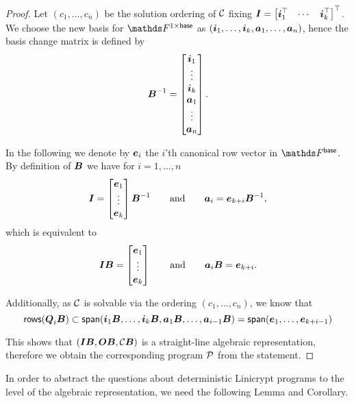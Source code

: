 \begin{proof}
Let $(c_1, \dots, c_n)$ be the solution ordering of $\C$ fixing $\I = \mtdts \vi k$.
We choose the new basis for $\Frowsp$ as $(\dts \vi k, \dts \va n)$, hence the basis change matrix is defined by
\[
    \B^{-1} = 
    \begin{bmatrix}
\vi_1 \\
\vdots \\
\vi_k \\
\va_1 \\
\vdots \\
\va_n
    \end{bmatrix}.
\]

In the following we denote by $\v e_i$ the $i$'th canonical row vector in $\Fsp$.
By definition of $\B$ we have for $i=1, \dots, n$
\begin{equation*}
\I = \begin{bmatrix}
    \v e_1 \\
    \vdots \\
    \v e_k
\end{bmatrix} \B^{-1}
\qquad \textrm{and} \qquad
\va_i = \v e_{k+i} \B^{-1},
\end{equation*}
which is equivalent to
\begin{equation*}
\I \B = \begin{bmatrix}
    \v e_1 \\
    \vdots \\
    \v e_k
\end{bmatrix}
\qquad \textrm{and} \qquad
\va_i \B = \v e_{k+i}.
\end{equation*}

Additionally, as $\C$ is solvable via the ordering $(c_1, \dots, c_n)$,
we know that 
\[
\rows(\Q_i \B) \subset \spn(\vi_1 \B, \dots, \vi_k \B, \va_1 \B, \dots, \va_{i-1} \B) = \spn( \ve_1, \dots, \ve_{k+i-1} )
\]

This shows that $(\I\B, \O\B, \C\B)$ is a straight-line algebraic representation,
therefore we obtain the corresponding program $\P$ from the statement.
\end{proof}

In order to abstract the questions about deterministic Linicrypt programs to the level of the algebraic representation,
we need the following Lemma and Corollary.

